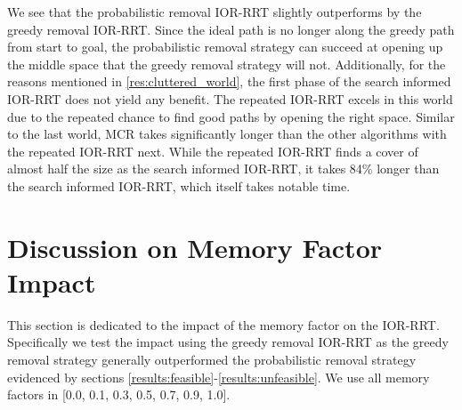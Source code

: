 
We see that the probabilistic removal IOR-RRT slightly outperforms by the greedy removal IOR-RRT. Since the ideal path is no longer along the greedy path from start to goal, the probabilistic removal strategy can succeed at opening up the middle space that the greedy removal strategy will not. Additionally, for the reasons mentioned in \ref{res:cluttered_world}, the first phase of the search informed IOR-RRT does not yield any benefit. The repeated IOR-RRT excels in this world due to the repeated chance to find good paths by opening the right space. Similar to the last world, MCR takes significantly longer than the other algorithms with the repeated IOR-RRT next. While the repeated IOR-RRT finds a cover of almost half the size as the search informed IOR-RRT, it takes 84\% longer than the search informed IOR-RRT, which itself takes notable time. 

\section{Discussion on Memory Factor Impact}\label{results:memoryfactor}
This section is dedicated to the impact of the memory factor on the IOR-RRT. Specifically we test the impact using the greedy removal IOR-RRT as the greedy removal strategy generally outperformed the probabilistic removal strategy evidenced by sections \ref{results:feasible}-\ref{results:unfeasible}. We use all memory factors in [0.0, 0.1, 0.3, 0.5, 0.7, 0.9, 1.0].

